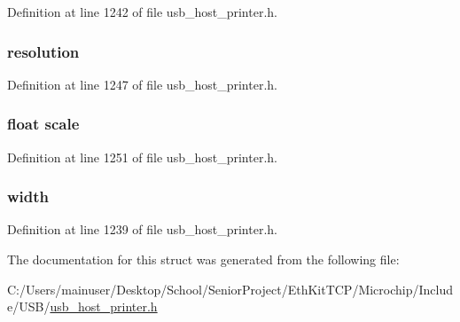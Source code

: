 Definition at line 1242 of file usb\+\_\+host\+\_\+printer.\+h.

\hypertarget{struct_u_s_b___p_r_i_n_t_e_r___i_m_a_g_e___i_n_f_o_a76c98c16c00105fdaae5ed2d134c539b}{}
\subsubsection[{resolution}]{ resolution}\label{struct_u_s_b___p_r_i_n_t_e_r___i_m_a_g_e___i_n_f_o_a76c98c16c00105fdaae5ed2d134c539b}


Definition at line 1247 of file usb\+\_\+host\+\_\+printer.\+h.

\hypertarget{struct_u_s_b___p_r_i_n_t_e_r___i_m_a_g_e___i_n_f_o_a1d28dec57cce925ad92342891bd71e7c}{}
\subsubsection[{scale}]{\setlength{\rightskip}{0pt plus 5cm}float scale}\label{struct_u_s_b___p_r_i_n_t_e_r___i_m_a_g_e___i_n_f_o_a1d28dec57cce925ad92342891bd71e7c}


Definition at line 1251 of file usb\+\_\+host\+\_\+printer.\+h.

\hypertarget{struct_u_s_b___p_r_i_n_t_e_r___i_m_a_g_e___i_n_f_o_a1fd31a71d8ffffeeacaa6eef4782ee24}{}
\subsubsection[{width}]{ width}\label{struct_u_s_b___p_r_i_n_t_e_r___i_m_a_g_e___i_n_f_o_a1fd31a71d8ffffeeacaa6eef4782ee24}


Definition at line 1239 of file usb\+\_\+host\+\_\+printer.\+h.



The documentation for this struct was generated from the following file\+:\begin{DoxyCompactItemize}
\item 
C\+:/\+Users/mainuser/\+Desktop/\+School/\+Senior\+Project/\+Eth\+Kit\+T\+C\+P/\+Microchip/\+Include/\+U\+S\+B/\hyperlink{usb__host__printer_8h}{usb\+\_\+host\+\_\+printer.\+h}\end{DoxyCompactItemize}
